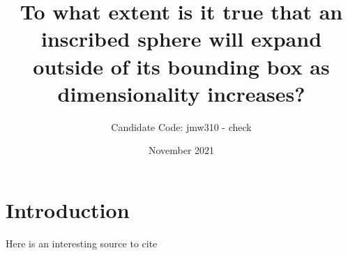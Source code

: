 \title{To what extent is it true that an inscribed sphere will expand outside of its bounding box as dimensionality increases?}
\author{Candidate Code: jmw310 - check}
\date{November 2021}

\maketitle


\section{Introduction}
Here is an interesting source to cite \cite{yuksel2015some}
